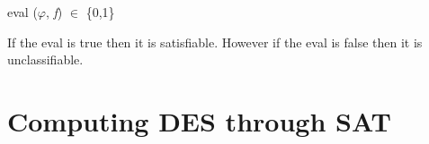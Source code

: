 \documentclass[11pt,a4paper]{report}
\begin{document}
\begin{center}
eval ($\varphi$, \textit{f}) $\in$ \{0,1\}
\end{center}
If the eval is true then it is satisfiable. However if the eval is false then it is unclassifiable. 


\chapter{Computing DES through SAT}
\label{cha:dessat}




\end{document}
